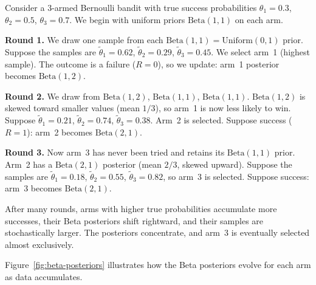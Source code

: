 \begin{example}
\label{ex:thompson-worked}
Consider a $3$-armed Bernoulli bandit with true success probabilities $\theta_1=0.3$, $\theta_2=0.5$, $\theta_3=0.7$.  We begin with uniform priors $\mathrm{Beta}(1,1)$ on each arm.

\textbf{Round 1.}  We draw one sample from each $\mathrm{Beta}(1,1)=\mathrm{Uniform}(0,1)$ prior.  Suppose the samples are $\tilde\theta_1=0.62$, $\tilde\theta_2=0.29$, $\tilde\theta_3=0.45$.  We select arm~1 (highest sample).  The outcome is a failure ($R=0$), so we update: arm~1 posterior becomes $\mathrm{Beta}(1,2)$.

\textbf{Round 2.}  We draw from $\mathrm{Beta}(1,2)$, $\mathrm{Beta}(1,1)$, $\mathrm{Beta}(1,1)$.  $\mathrm{Beta}(1,2)$ is skewed toward smaller values (mean $1/3$), so arm~1 is now less likely to win.  Suppose $\tilde\theta_1=0.21$, $\tilde\theta_2=0.74$, $\tilde\theta_3=0.38$.  Arm~2 is selected.  Suppose success ($R=1$): arm~2 becomes $\mathrm{Beta}(2,1)$.

\textbf{Round 3.}  Now arm~3 has never been tried and retains its $\mathrm{Beta}(1,1)$ prior.  Arm~2 has a $\mathrm{Beta}(2,1)$ posterior (mean $2/3$, skewed upward).  Suppose the samples are $\tilde\theta_1=0.18$, $\tilde\theta_2=0.55$, $\tilde\theta_3=0.82$, so arm~3 is selected.  Suppose success: arm~3 becomes $\mathrm{Beta}(2,1)$.

After many rounds, arms with higher true probabilities accumulate more successes, their Beta posteriors shift rightward, and their samples are stochastically larger.  The posteriors concentrate, and arm~3 is eventually selected almost exclusively.
\end{example}

Figure~\ref{fig:beta-posteriors} illustrates how the Beta posteriors evolve for each arm as data accumulates.

